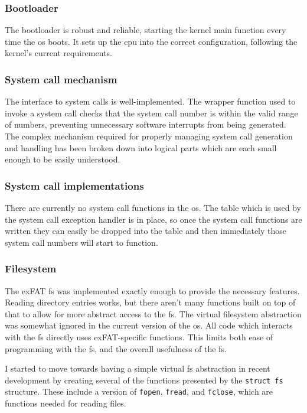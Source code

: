 \documentclass{article}
\begin{document}
\subsubsection{Bootloader}
The bootloader is robust and reliable, starting the kernel main function every
time the \gls{os} boots. It sets up the \gls{cpu} into the correct
configuration, following the kernel's current requirements.

\subsubsection{System call mechanism}
The interface to system calls is well-implemented. The wrapper function used to
invoke a system call checks that the system call number is within the valid
range of numbers, preventing unnecessary software interrupts from being
generated. The complex mechanism required for properly managing system call
generation and handling has been broken down into logical parts which are each
small enough to be easily understood.

\subsubsection{System call implementations}
\label{sec:eval_no_syscalls}
There are currently no system call functions in the \gls{os}. The table which
is used by the system call exception handler is in place, so once the system
call functions are written they can easily be dropped into the table and then
immediately those system call numbers will start to function.

\subsubsection{Filesystem}
The exFAT \gls{fs} was implemented exactly enough to provide the necessary
features. Reading directory entries works, but there aren't many functions
built on top of that to allow for more abstract access to the \gls{fs}. The
virtual filesystem abstraction was somewhat ignored in the current version of
the \gls{os}. All code which interacts with the \gls{fs} directly uses
exFAT-specific functions. This limits both ease of programming with the
\gls{fs}, and the overall usefulness of the \gls{fs}.

I started to move towards having a simple virtual \gls{fs} abstraction in
recent development by creating several of the functions presented by the
\verb!struct fs! structure. These include a version of \texttt{fopen},
\texttt{fread}, and \texttt{fclose}, which are functions needed for reading
files.
\end{document}
